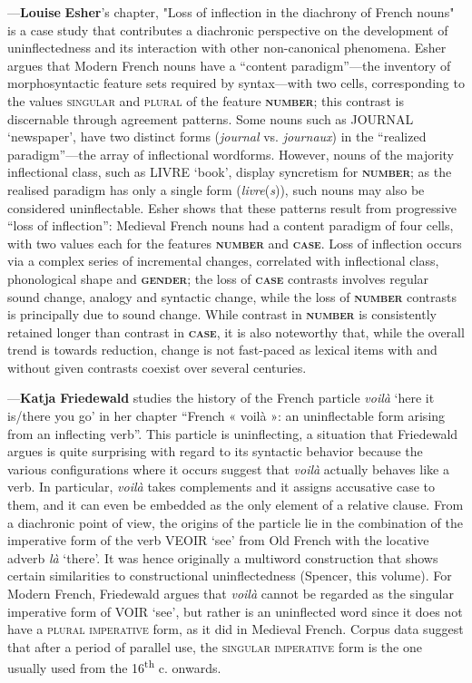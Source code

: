 \documentclass[output=paper]{langscibook}
\begin{document}
—\textbf{Louise} \textbf{Esher}’s chapter, "Loss of inflection in the diachrony of French nouns" is a case study that contributes a diachronic perspective on the development of uninflectedness and its interaction with other non-canonical phenomena. Esher argues that Modern French nouns have a “content paradigm”—the inventory of morphosyntactic feature sets required by syntax—with two cells, corresponding to the values \textsc{singular} and \textsc{plural} of the feature \textbf{\textsc{number}}; this contrast is discernable through agreement patterns. Some nouns such as JOURNAL ‘newspaper’, have two distinct forms (\textit{journal} vs. \textit{journaux}) in the “realized paradigm”—the array of inflectional wordforms. However, nouns of the majority inflectional class, such as LIVRE ‘book’, display syncretism for \textbf{\textsc{number}}; as the realised paradigm has only a single form (\textit{livre}(\textit{s})), such nouns may also be considered uninflectable. Esher shows that these patterns result from progressive “loss of inflection”: Medieval French nouns had a content paradigm of four cells, with two values each for the features \textbf{\textsc{number}} and \textbf{\textsc{case}}. Loss of inflection occurs via a complex series of incremental changes, correlated with inflectional class, phonological shape and \textbf{\textsc{gender}}; the loss of \textbf{\textsc{case}} contrasts involves regular sound change, analogy and syntactic change, while the loss of \textbf{\textsc{number}} contrasts is principally due to sound change. While contrast in \textbf{\textsc{number}} is consistently retained longer than contrast in \textbf{\textsc{case}}, it is also noteworthy that, while the overall trend is towards reduction, change is not fast-paced as lexical items with and without given contrasts coexist over several centuries.

—\textbf{Katja} \textbf{Friedewald} studies the history of the French particle \textit{voilà} ‘here it is/there you go’ in her chapter “French « voilà »: an uninflectable form arising from an inflecting verb”. This particle is uninflecting, a situation that Friedewald argues is quite surprising with regard to its syntactic behavior because the various configurations where it occurs suggest that \textit{voilà} actually behaves like a verb. In particular, \textit{voilà} takes complements and it assigns accusative case to them, and it can even be embedded as the only element of a relative clause. From a diachronic point of view, the origins of the particle lie in the combination of the imperative form of the verb VEOIR ‘see’ from Old French with the locative adverb \textit{là} ‘there’. It was hence originally a multiword construction that shows certain similarities to constructional uninflectedness (Spencer, this volume). For Modern French, Friedewald argues that \textit{voilà} cannot be regarded as the singular imperative form of VOIR ‘see’, but rather is an uninflected word since it does not have a \textsc{plural} \textsc{imperative} form, as it did in Medieval French. Corpus data suggest that after a period of parallel use, the \textsc{singular} \textsc{imperative} form is the one usually used from the 16\textsuperscript{th} c. onwards. 
\end{document}
